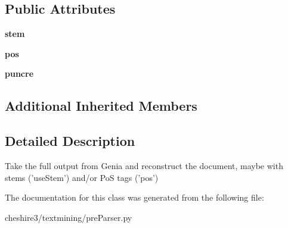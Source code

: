 \subsection*{Public Attributes}
\begin{DoxyCompactItemize}
\item 
\hypertarget{classcheshire3_1_1textmining_1_1pre_parser_1_1_genia_text_pre_parser_a5e12a4a5c42c8bcf5c5615763e6d6183}{{\bfseries stem}}\label{classcheshire3_1_1textmining_1_1pre_parser_1_1_genia_text_pre_parser_a5e12a4a5c42c8bcf5c5615763e6d6183}

\item 
\hypertarget{classcheshire3_1_1textmining_1_1pre_parser_1_1_genia_text_pre_parser_a3af5bf5146084594c38515450ce76a56}{{\bfseries pos}}\label{classcheshire3_1_1textmining_1_1pre_parser_1_1_genia_text_pre_parser_a3af5bf5146084594c38515450ce76a56}

\item 
\hypertarget{classcheshire3_1_1textmining_1_1pre_parser_1_1_genia_text_pre_parser_a6dcfb23f493fefd2f404f347f45d133b}{{\bfseries puncre}}\label{classcheshire3_1_1textmining_1_1pre_parser_1_1_genia_text_pre_parser_a6dcfb23f493fefd2f404f347f45d133b}

\end{DoxyCompactItemize}
\subsection*{Additional Inherited Members}


\subsection{Detailed Description}
\begin{DoxyVerb}Take the full output from Genia and reconstruct the document, maybe with stems ('useStem') and/or PoS tags ('pos') \end{DoxyVerb}
 

The documentation for this class was generated from the following file\-:\begin{DoxyCompactItemize}
\item 
cheshire3/textmining/pre\-Parser.\-py\end{DoxyCompactItemize}
